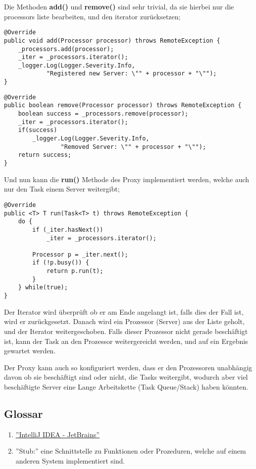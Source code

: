 Die Methoden \textbf{add()} und \textbf{remove()} sind sehr trivial, da sie hierbei nur die processors liste bearbeiten, und den iterator zurücksetzen;

\begin{lstlisting}[style=Java, caption=Proxy Implementation - Proxy::add]
@Override
public void add(Processor processor) throws RemoteException {
    _processors.add(processor);
    _iter = _processors.iterator();
    _logger.Log(Logger.Severity.Info,
            "Registered new Server: \"" + processor + "\"");
}
\end{lstlisting}

\begin{lstlisting}[style=Java, caption=Proxy Implementation - Proxy::remove]
@Override
public boolean remove(Processor processor) throws RemoteException {
    boolean success = _processors.remove(processor);
    _iter = _processors.iterator();
    if(success)
        _logger.Log(Logger.Severity.Info,
                "Removed Server: \"" + processor + "\"");
    return success;
}
\end{lstlisting}

Und nun kann die \textbf{run()} Methode des Proxy implementiert werden, welche auch nur den Task einem Server weitergibt;

\begin{lstlisting}[style=Java, caption=Proxy Implementation - Proxy::run]
@Override
public <T> T run(Task<T> t) throws RemoteException {
    do {
        if (_iter.hasNext())
            _iter = _processors.iterator();

        Processor p = _iter.next();
        if (!p.busy()) {
            return p.run(t);
        }
    } while(true);
}
\end{lstlisting}

Der Iterator wird überprüft ob er am Ende angelangt ist, falls dies der Fall ist, wird er zurückgesetzt.
Danach wird ein Prozessor (Server) aus der Liste geholt, und der Iterator weitergeschoben.
Falls dieser Prozessor nicht gerade beschäftigt ist, kann der Task an den Prozessor weitergereicht werden, und auf ein Ergebnis gewartet werden.

Der Proxy kann auch so konfiguriert werden, dass er den Prozessoren unabhängig davon ob sie beschäftigt sind oder nicht, die Tasks weitergibt, wodurch aber viel beschäftigte Server eine Lange Arbeitskette (Task Queue/Stack) haben könnten.

\clearpage

\subsection{Glossar}
\begin{enumerate}
    \item \href{https://www.jetbrains.com/idea}{\color{blue}\underline{''IntelliJ IDEA - JetBrains''}}
    \item ''Stub:'' eine Schnittstelle zu Funktionen oder Prozeduren, welche auf einem anderen System implementiert sind.
\end{enumerate}


